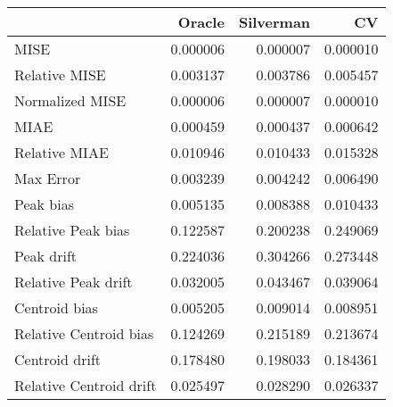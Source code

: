 \begin{tabular}{lrrr}
  \hline
 & Oracle & Silverman & CV \\ 
  \hline
MISE & 0.000006 & 0.000007 & 0.000010 \\ 
  Relative MISE & 0.003137 & 0.003786 & 0.005457 \\ 
  Normalized MISE & 0.000006 & 0.000007 & 0.000010 \\ 
  MIAE & 0.000459 & 0.000437 & 0.000642 \\ 
  Relative MIAE & 0.010946 & 0.010433 & 0.015328 \\ 
  Max Error & 0.003239 & 0.004242 & 0.006490 \\ 
  Peak bias & 0.005135 & 0.008388 & 0.010433 \\ 
  Relative Peak bias & 0.122587 & 0.200238 & 0.249069 \\ 
  Peak drift & 0.224036 & 0.304266 & 0.273448 \\ 
  Relative Peak drift & 0.032005 & 0.043467 & 0.039064 \\ 
  Centroid bias & 0.005205 & 0.009014 & 0.008951 \\ 
  Relative Centroid bias & 0.124269 & 0.215189 & 0.213674 \\ 
  Centroid drift & 0.178480 & 0.198033 & 0.184361 \\ 
  Relative Centroid drift & 0.025497 & 0.028290 & 0.026337 \\ 
   \hline
\end{tabular}

